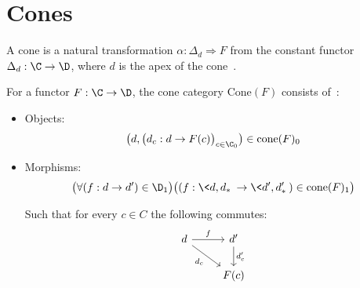 \section{Cones}

\begin{definition}[Cone]
  A cone is a natural transformation $\alpha: \Delta_d \Rightarrow F$ from the
	constant functor $\Delta_d:\C\to \D$, where $d$ is the apex of the
	cone~\parencite[p.~118]{leinster:basic_category_theory}.
\end{definition}

\begin{definition}
  For a functor $F:\C\to \D$, the cone category $\mathrm{Cone}(F)$ consists
  of~\parencite[p.~75]{riehl:category_theory_in_context}:
  \begin{itemize}
    \item Objects:
      \[\big(d, \big(d_c: d \to F(c)\big)_{c\in \C_0}\big)\in
        \mathrm{cone}(F)_0\]
    \item Morphisms:
      \[\big(\forall (f : d \to d') \in \D_1\big)
        \big((f: \<d, d_*\>\to \<d', d'_*\>) \in \mathrm{cone}(F)_1\big)\]

      Such that for every $c\in C$ the following commutes:
      \[\begin{tikzcd}
        d & {d'} \\
        & {F(c)}
        \arrow["{d_c}"', from=1-1, to=2-2]
        \arrow["{d'_c}", from=1-2, to=2-2]
        \arrow["f", from=1-1, to=1-2]
      \end{tikzcd}\]
  \end{itemize}
\end{definition}